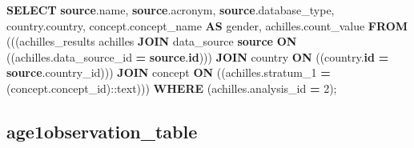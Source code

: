 \documentclass[
]{book}
\newenvironment{Shaded}{\begin{snugshade}}{\end{snugshade}}
\newcommand{\CharTok}[1]{\textcolor[rgb]{0.31,0.60,0.02}{#1}}
\newcommand{\DecValTok}[1]{\textcolor[rgb]{0.00,0.00,0.81}{#1}}
\newcommand{\KeywordTok}[1]{\textcolor[rgb]{0.13,0.29,0.53}{\textbf{#1}}}
\newcommand{\NormalTok}[1]{#1}
\newcommand{\OperatorTok}[1]{\textcolor[rgb]{0.81,0.36,0.00}{\textbf{#1}}}
\begin{document}
\begin{Shaded}
\begin{Highlighting}[]
\KeywordTok{SELECT} \KeywordTok{source}\NormalTok{.name,}
   \KeywordTok{source}\NormalTok{.acronym,}
   \KeywordTok{source}\NormalTok{.database\_type,}
\NormalTok{   country.country,}
\NormalTok{   concept.concept\_name }\KeywordTok{AS}\NormalTok{ gender,}
\NormalTok{   achilles.count\_value}
  \KeywordTok{FROM}\NormalTok{ (((achilles\_results achilles}
    \KeywordTok{JOIN}\NormalTok{ data\_source }\KeywordTok{source}
      \KeywordTok{ON}\NormalTok{ ((achilles.data\_source\_id }\OperatorTok{=} \KeywordTok{source}\NormalTok{.}\KeywordTok{id}\NormalTok{)))}
    \KeywordTok{JOIN}\NormalTok{ country }\KeywordTok{ON}\NormalTok{ ((country.}\KeywordTok{id} \OperatorTok{=} \KeywordTok{source}\NormalTok{.country\_id)))}
    \KeywordTok{JOIN}\NormalTok{ concept}
      \KeywordTok{ON}\NormalTok{ ((achilles.stratum\_1 }\OperatorTok{=}\NormalTok{ (concept.concept\_id):}\CharTok{:text}\NormalTok{)))}
 \KeywordTok{WHERE}\NormalTok{ (achilles.analysis\_id }\OperatorTok{=} \DecValTok{2}\NormalTok{);}
\end{Highlighting}
\end{Shaded}

\hypertarget{age1observation_table}{%
\subsection*{age1observation\_table}\label{age1observation_table}}
\end{document}
